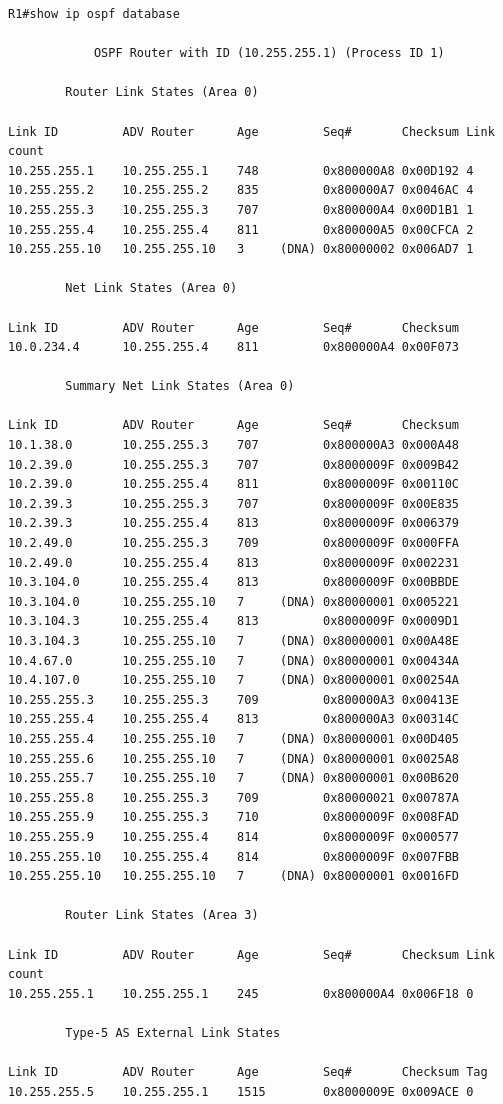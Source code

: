 \documentclass[12pt,twoside,a4paper]{report}
\begin{document}
\noindent
{\selectfont
\begin{small}
\begin{verbatim}
R1#show ip ospf database 

            OSPF Router with ID (10.255.255.1) (Process ID 1)

		Router Link States (Area 0)

Link ID         ADV Router      Age         Seq#       Checksum Link count
10.255.255.1    10.255.255.1    748         0x800000A8 0x00D192 4
10.255.255.2    10.255.255.2    835         0x800000A7 0x0046AC 4
10.255.255.3    10.255.255.3    707         0x800000A4 0x00D1B1 1
10.255.255.4    10.255.255.4    811         0x800000A5 0x00CFCA 2
10.255.255.10   10.255.255.10   3     (DNA) 0x80000002 0x006AD7 1

		Net Link States (Area 0)

Link ID         ADV Router      Age         Seq#       Checksum
10.0.234.4      10.255.255.4    811         0x800000A4 0x00F073

		Summary Net Link States (Area 0)

Link ID         ADV Router      Age         Seq#       Checksum
10.1.38.0       10.255.255.3    707         0x800000A3 0x000A48
10.2.39.0       10.255.255.3    707         0x8000009F 0x009B42
10.2.39.0       10.255.255.4    811         0x8000009F 0x00110C
10.2.39.3       10.255.255.3    707         0x8000009F 0x00E835
10.2.39.3       10.255.255.4    813         0x8000009F 0x006379
10.2.49.0       10.255.255.3    709         0x8000009F 0x000FFA
10.2.49.0       10.255.255.4    813         0x8000009F 0x002231
10.3.104.0      10.255.255.4    813         0x8000009F 0x00BBDE
10.3.104.0      10.255.255.10   7     (DNA) 0x80000001 0x005221
10.3.104.3      10.255.255.4    813         0x8000009F 0x0009D1
10.3.104.3      10.255.255.10   7     (DNA) 0x80000001 0x00A48E
10.4.67.0       10.255.255.10   7     (DNA) 0x80000001 0x00434A
10.4.107.0      10.255.255.10   7     (DNA) 0x80000001 0x00254A
10.255.255.3    10.255.255.3    709         0x800000A3 0x00413E
10.255.255.4    10.255.255.4    813         0x800000A3 0x00314C
10.255.255.4    10.255.255.10   7     (DNA) 0x80000001 0x00D405
10.255.255.6    10.255.255.10   7     (DNA) 0x80000001 0x0025A8
10.255.255.7    10.255.255.10   7     (DNA) 0x80000001 0x00B620
10.255.255.8    10.255.255.3    709         0x80000021 0x00787A
10.255.255.9    10.255.255.3    710         0x8000009F 0x008FAD
10.255.255.9    10.255.255.4    814         0x8000009F 0x000577
10.255.255.10   10.255.255.4    814         0x8000009F 0x007FBB
10.255.255.10   10.255.255.10   7     (DNA) 0x80000001 0x0016FD

		Router Link States (Area 3)

Link ID         ADV Router      Age         Seq#       Checksum Link count
10.255.255.1    10.255.255.1    245         0x800000A4 0x006F18 0

		Type-5 AS External Link States

Link ID         ADV Router      Age         Seq#       Checksum Tag
10.255.255.5    10.255.255.1    1515        0x8000009E 0x009ACE 0

\end{verbatim}
\end{small}
}
\end{document}
